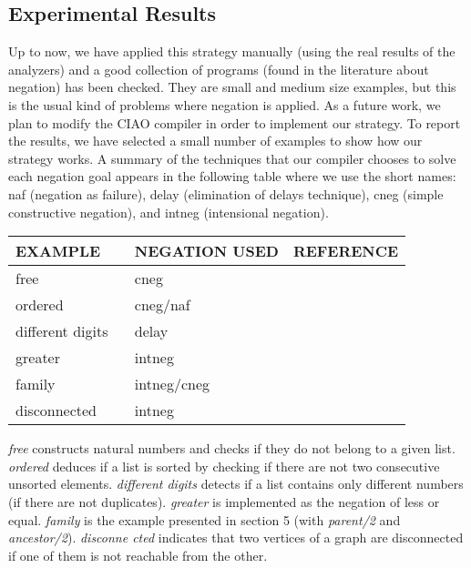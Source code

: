 \documentclass[]{llncs}
\begin{document}
\subsection{Experimental Results}

Up to now, we have applied this strategy manually (using the real
results of the analyzers) and a good collection of programs (found 
in the literature about negation) has been checked. They are
small and medium size examples, but this is the usual kind of problems
where negation is applied.
As a future work, we plan to modify
the CIAO compiler in order to implement our strategy.
To report the results, we have selected a small number of 
examples to show how our strategy works.
A summary of the techniques that our compiler chooses to solve
each negation goal appears in the following table where we use the short
names: naf (negation as failure), delay (elimination of delays
technique), cneg (simple constructive negation), and intneg
(intensional negation). 
\medskip
\begin{center}
\begin{tabular}{lll}
EXAMPLE & NEGATION USED & REFERENCE \\
\hline
\hline
free                        & cneg   & \cite{Stark}    \\
ordered                     & cneg/naf   & \cite{Chan2}    \\
different digits ~\hspace{0.8cm}            & delay       & \cite{Chan2}    \\
greater                     & intneg      & \cite{Barbuti1} \\
family                      & intneg/cneg ~\hspace{1.8cm}~& \cite{Lloyd}    \\
disconnected                & intneg & \cite{VGelder}  \\
\end{tabular}
\end{center}
\medskip
{\em free} constructs natural numbers and checks if they do not belong
to a given list. {\em ordered} deduces if a list is sorted by checking
if there are not
two consecutive unsorted elements. {\em different digits} detects if a list
contains only different numbers (if there are not duplicates). {\em greater}
is implemented as the negation of less or equal. {\em family} is the example
presented in section 5 (with {\em parent/2} and {\em ancestor/2}). {\em disconne
cted} indicates that two vertices of
a graph are disconnected if one of them is not reachable from the other.
\end{document}
